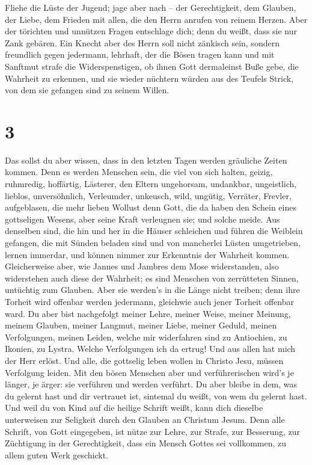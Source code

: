  Fliehe die Lüste der Jugend; jage aber nach -- der
Gerechtigkeit, dem Glauben, der Liebe, dem Frieden mit allen, die den
Herrn anrufen von reinem Herzen.  Aber der törichten und
unnützen Fragen entschlage dich; denn du weißt, dass sie nur Zank
gebären.  Ein Knecht aber des Herrn soll nicht zänkisch
sein, sondern freundlich gegen jedermann, lehrhaft, der die Bösen tragen
kann  und mit Sanftmut strafe die Widerspenstigen, ob
ihnen Gott dermaleinst Buße gebe, die Wahrheit zu erkennen,
 und sie wieder nüchtern würden aus des Teufels Strick,
von dem sie gefangen sind zu seinem Willen.

\hypertarget{section-2}{%
\section{3}\label{section-2}}

 Das sollst du aber wissen, dass in den letzten Tagen
werden gräuliche Zeiten kommen.  Denn es werden Menschen
sein, die viel von sich halten, geizig, ruhmredig, hoffärtig, Lästerer,
den Eltern ungehorsam, undankbar, ungeistlich,  lieblos,
unversöhnlich, Verleumder, unkeusch, wild, ungütig, 
Verräter, Frevler, aufgeblasen, die mehr lieben Wollust denn Gott,
 die da haben den Schein eines gottseligen Wesens, aber
seine Kraft verleugnen sie; und solche meide.  Aus
denselben sind, die hin und her in die Häuser schleichen und führen die
Weiblein gefangen, die mit Sünden beladen sind und von mancherlei Lüsten
umgetrieben,  lernen immerdar, und können nimmer zur
Erkenntnis der Wahrheit kommen.  Gleicherweise aber, wie
Jannes und Jambres dem Mose widerstanden, also widerstehen auch diese
der Wahrheit; es sind Menschen von zerrütteten Sinnen, untüchtig zum
Glauben.  Aber sie werden's in die Länge nicht treiben;
denn ihre Torheit wird offenbar werden jedermann, gleichwie auch jener
Torheit offenbar ward.  Du aber bist nachgefolgt meiner
Lehre, meiner Weise, meiner Meinung, meinem Glauben, meiner Langmut,
meiner Liebe, meiner Geduld,  meinen Verfolgungen, meinen
Leiden, welche mir widerfahren sind zu Antiochien, zu Ikonien, zu
Lystra. Welche Verfolgungen ich da ertrug! Und aus allen hat mich der
Herr erlöst.  Und alle, die gottselig leben wollen in
Christo Jesu, müssen Verfolgung leiden.  Mit den bösen
Menschen aber und verführerischen wird's je länger, je ärger: sie
verführen und werden verführt.  Du aber bleibe in dem,
was du gelernt hast und dir vertrauet ist, sintemal du weißt, von wem du
gelernt hast.  Und weil du von Kind auf die heilige
Schrift weißt, kann dich dieselbe unterweisen zur Seligkeit durch den
Glauben an Christum Jesum.  Denn alle Schrift, von Gott
eingegeben, ist nütze zur Lehre, zur Strafe, zur Besserung, zur
Züchtigung in der Gerechtigkeit,  dass ein Mensch Gottes
sei vollkommen, zu allem guten Werk geschickt.

